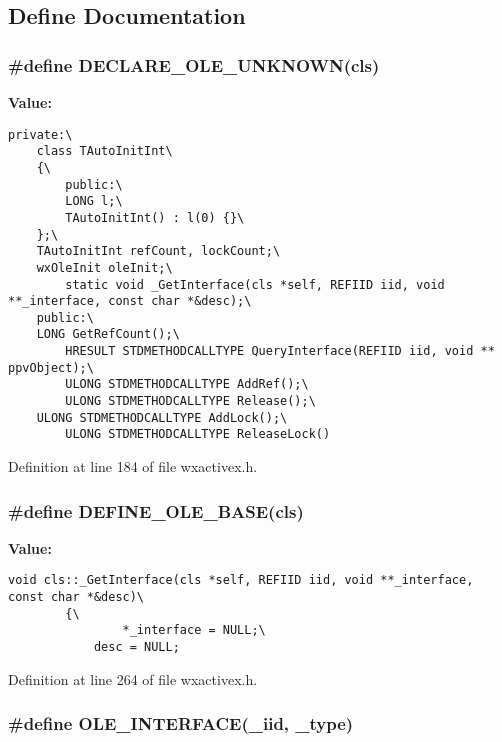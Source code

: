 \subsection{Define Documentation}
\subsubsection{\setlength{\rightskip}{0pt plus 5cm}\#define DECLARE\_\-OLE\_\-UNKNOWN(cls)}\label{wxactivex_8h_a3}


{\bf Value:}

\footnotesize\begin{verbatim}private:\
    class TAutoInitInt\
    {\
        public:\
        LONG l;\
        TAutoInitInt() : l(0) {}\
    };\
    TAutoInitInt refCount, lockCount;\
    wxOleInit oleInit;\
        static void _GetInterface(cls *self, REFIID iid, void **_interface, const char *&desc);\
    public:\
    LONG GetRefCount();\
        HRESULT STDMETHODCALLTYPE QueryInterface(REFIID iid, void ** ppvObject);\
        ULONG STDMETHODCALLTYPE AddRef();\
        ULONG STDMETHODCALLTYPE Release();\
    ULONG STDMETHODCALLTYPE AddLock();\
        ULONG STDMETHODCALLTYPE ReleaseLock()
\end{verbatim}\normalsize 


Definition at line 184 of file wxactivex.h.
\subsubsection{\setlength{\rightskip}{0pt plus 5cm}\#define DEFINE\_\-OLE\_\-BASE(cls)}\label{wxactivex_8h_a5}


{\bf Value:}

\footnotesize\begin{verbatim}void cls::_GetInterface(cls *self, REFIID iid, void **_interface, const char *&desc)\
        {\
                *_interface = NULL;\
            desc = NULL;
\end{verbatim}\normalsize 


Definition at line 264 of file wxactivex.h.
\subsubsection{\setlength{\rightskip}{0pt plus 5cm}\#define OLE\_\-INTERFACE(\_\-iid, \_\-type)}\label{wxactivex_8h_a6}


